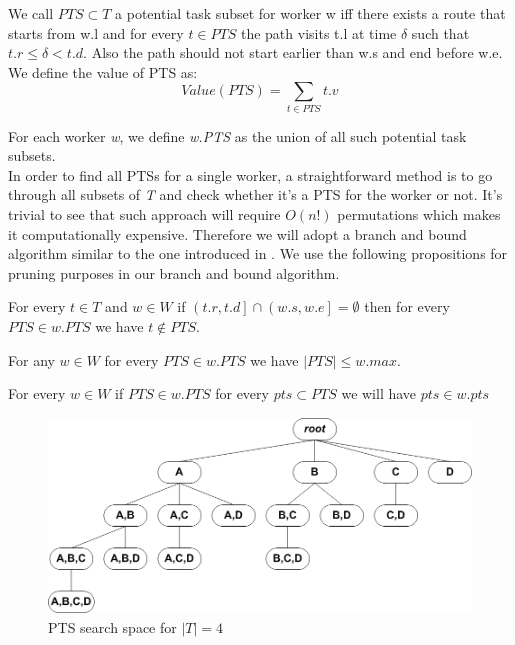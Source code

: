 \begin{definition} 
\label{def:PTS}
We call $PTS \subset T$ a potential task subset for worker w iff there exists a route that starts from w.l and for every $t \in PTS$ the path visits t.l at time $\delta$ such that $t.r \leq \delta < t.d$. Also the path should not start earlier than w.s and end before w.e. We define the value of PTS as:
\begin{equation*}
Value(PTS) = \sum_{t \in PTS} t.v
\end{equation*}
\end{definition}

For each worker \emph{w}, we define \emph{w.PTS} as the union of all such potential task subsets.\\

In order to find all PTSs for a single worker, a straightforward method is to go through all subsets of \emph{T} and check whether it's a PTS for the worker or not. It's trivial to see that such approach will require $O(n!)$ permutations which makes it computationally expensive. Therefore we will adopt a branch and bound algorithm similar to the one introduced in \cite{deng13}. We use the following propositions for pruning purposes in our branch and bound algorithm.

\begin{proposition}
\label{prop:overlap}
For every $t \in T$ and $w \in W$ if $\left(t.r, t.d \right] \cap \left( w.s, w.e \right] = \emptyset$ then for every $PTS \in w.PTS$ we have $t \not\in PTS$.
\end{proposition}

\begin{proposition}
\label{prop:size}
For any $w \in W$ for every $PTS \in w.PTS$ we have $\left\vert{PTS}\right\vert \leq w.max$.
\end{proposition}

\begin{proposition}
\label{prop:subset}
For every $w \in W$ if $PTS \in w.PTS$ for every $pts \subset PTS$ we will have $pts \in w.pts$
\end{proposition}

\begin{figure}[t]
	\centering
	\includegraphics[width = 0.85\columnwidth]{figures/PTS_tree.png}
			\vspace{-0.2cm}
	\caption{PTS search space for $\left\vert T \right\vert = 4$}
	\label{fig:PTS_tree}
			\vspace{-0.2cm}
\end{figure}

